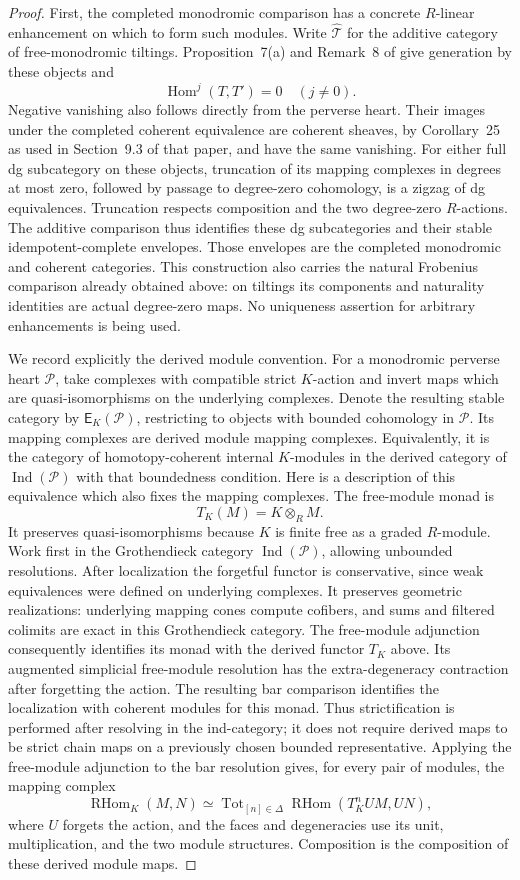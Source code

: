 \documentclass[11pt]{article}
\numberwithin{equation}{section}
\theoremstyle{definition}
\theoremstyle{remark}
\newcommand{\Hom}{\operatorname{Hom}}
\newcommand{\RHom}{\operatorname{RHom}}
\begin{document}
\begin{proof}
First, the completed monodromic comparison has a concrete
$R$-linear enhancement on which to form such modules.  Write
$\widehat{\mathcal T}$ for the additive category of free-monodromic
tiltings.  Proposition~7(a) and Remark~8 of
\cite{Enh:Bezrukavnikov} give generation by these objects and
\[
 \Hom^j(T,T')=0\quad(j\ne0).
\]
Negative vanishing also follows directly from the perverse heart.
Their images under the completed coherent equivalence are coherent
sheaves, by Corollary~25 as used in Section~9.3 of that paper, and
have the same vanishing.  For either full dg subcategory on these
objects, truncation of its mapping complexes in degrees at most zero,
followed by passage to degree-zero cohomology, is a zigzag of dg
equivalences.  Truncation respects composition and the two degree-zero
$R$-actions.  The additive comparison thus identifies these dg
subcategories and their stable idempotent-complete envelopes.
Those envelopes are the completed monodromic and coherent categories.
This construction also carries the natural Frobenius comparison
already obtained above: on tiltings its components and naturality
identities are actual degree-zero maps.  No uniqueness assertion for
arbitrary enhancements is being used.

We record explicitly the derived module convention.  For a
monodromic perverse heart $\mathcal P$, take complexes with compatible
strict $K$-action and invert maps which are quasi-isomorphisms on
the underlying complexes.  Denote the resulting stable category by
$\mathsf E_K(\mathcal P)$, restricting to objects with bounded
cohomology in $\mathcal P$.  Its mapping complexes are derived module
mapping complexes.  Equivalently, it is the category of homotopy-coherent
internal $K$-modules in the derived category of
$\operatorname{Ind}(\mathcal P)$ with that boundedness condition.
Here is a description of this equivalence which also fixes the mapping
complexes.  The free-module monad is
\[
 T_K(M)=K\otimes_R M.
\]
It preserves quasi-isomorphisms because $K$ is finite free as a
graded $R$-module.  Work first in the Grothendieck category
$\operatorname{Ind}(\mathcal P)$, allowing unbounded resolutions.
After localization the forgetful functor is conservative, since
weak equivalences were defined on underlying complexes.  It
preserves geometric realizations: underlying mapping cones compute
cofibers, and sums and filtered colimits are exact in this
Grothendieck category.  The free-module adjunction consequently
identifies its monad with the derived functor $T_K$ above.
Its augmented simplicial free-module resolution has the
extra-degeneracy contraction after forgetting the action.  The
resulting bar comparison identifies the localization with coherent
modules for this monad.  Thus strictification is performed after
resolving in the ind-category; it does not require derived maps to
be strict chain maps on a previously chosen bounded representative.
Applying the free-module adjunction to the bar resolution gives, for
every pair of modules, the mapping complex
\[
 \RHom_K(M,N)
  \simeq
  \operatorname{Tot}_{[n]\in\Delta}
  \RHom(T_K^nUM,UN),
\]
where $U$ forgets the action, and the faces and degeneracies use its
unit, multiplication, and the two module structures.  Composition is
the composition of these derived module maps.


\end{proof}
\end{document}
